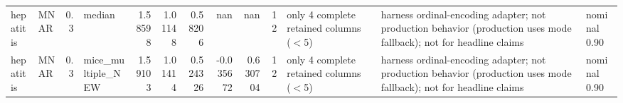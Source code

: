 \begin{table}[ht]
\begin{tabular}{llrlrrrrrrllll}
 hepatitis & MNAR        &         0.3 & median            &       1.58598  &             1.01148  &                 0.58206  &                   nan          &                       nan        &        12 & only 4 complete retained columns (\ensuremath{<}5) &                                                                       & harness ordinal-encoding adapter; not production behavior (production uses mode fallback); not for headline claims & nominal 0.90              \\
 hepatitis & MNAR        &         0.3 & mice\_multiple\_NEW &       1.59103  &             1.01414  &                 0.524326 &                    -0.035672   &                         0.630704 &        12 & only 4 complete retained columns (\ensuremath{<}5) &                                                                       & harness ordinal-encoding adapter; not production behavior (production uses mode fallback); not for headline claims & nominal 0.90              \\
\hline
\end{tabular}
\end{table}
